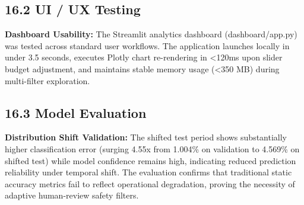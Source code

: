\subsection{16.2 UI / UX Testing}

\textbf{Dashboard Usability:} The Streamlit analytics dashboard (dashboard/app.py) was tested across standard user workflows. The application launches locally in under 3.5 seconds, executes Plotly chart re-rendering in <120ms upon slider budget adjustment, and maintains stable memory usage (<350 MB) during multi-filter exploration.

\subsection{16.3 Model Evaluation}

\textbf{Distribution Shift Validation:} The shifted test period shows substantially higher classification error (surging 4.55x from 1.004\% on validation to 4.569\% on shifted test) while model confidence remains high, indicating reduced prediction reliability under temporal shift. The evaluation confirms that traditional static accuracy metrics fail to reflect operational degradation, proving the necessity of adaptive human-review safety filters.

